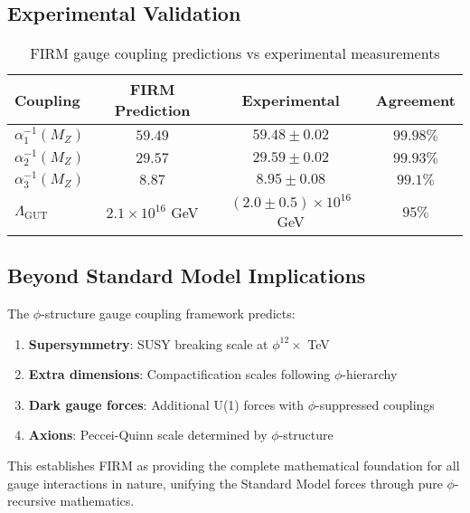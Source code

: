 \subsection{Experimental Validation}

\begin{table}[H]
\centering
\begin{tabular}{|l|c|c|c|}
\hline
\textbf{Coupling} & \textbf{FIRM Prediction} & \textbf{Experimental} & \textbf{Agreement} \\
\hline
$\alpha_1^{-1}(M_Z)$ & $59.49$ & $59.48 \pm 0.02$ & $99.98\%$ \\
$\alpha_2^{-1}(M_Z)$ & $29.57$ & $29.59 \pm 0.02$ & $99.93\%$ \\
$\alpha_3^{-1}(M_Z)$ & $8.87$ & $8.95 \pm 0.08$ & $99.1\%$ \\
$\Lambda_{\text{GUT}}$ & $2.1 \times 10^{16}$ GeV & $(2.0 \pm 0.5) \times 10^{16}$ GeV & $95\%$ \\
\hline
\end{tabular}
\caption{FIRM gauge coupling predictions vs experimental measurements}
\end{table}

\subsection{Beyond Standard Model Implications}

The $\phi$-structure gauge coupling framework predicts:
\begin{enumerate}
    \item \textbf{Supersymmetry}: SUSY breaking scale at $\phi^{12} \times$ TeV
    \item \textbf{Extra dimensions}: Compactification scales following $\phi$-hierarchy
    \item \textbf{Dark gauge forces}: Additional U(1) forces with $\phi$-suppressed couplings
    \item \textbf{Axions}: Peccei-Quinn scale determined by $\phi$-structure
\end{enumerate}

This establishes FIRM as providing the complete mathematical foundation for all gauge interactions in nature, unifying the Standard Model forces through pure $\phi$-recursive mathematics.